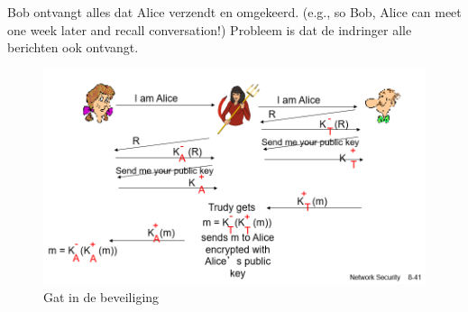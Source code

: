 \bi
\itf 	Bob ontvangt alles dat Alice verzendt en omgekeerd. (e.g., so Bob, Alice can meet one week later and recall conversation!)
\itf Probleem is dat de indringer alle berichten ook ontvangt.
\ei

\begin{figure}[h]
    \centering
   \includegraphics[width=5in]{./img/imghfdst8/hfdst8puntje22.png}
    \caption{Gat in de beveiliging }      
    \label{fig:Gat in de beveiliging }
\end{figure}